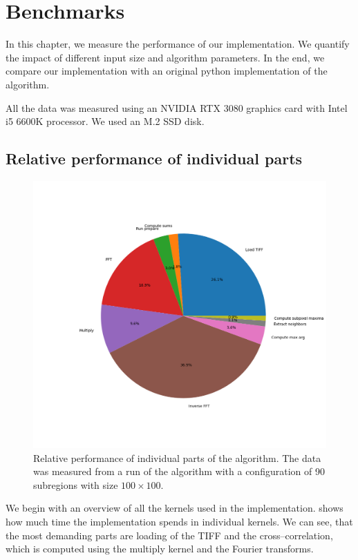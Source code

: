 \chapter{Benchmarks}

In this chapter, we measure the performance of our implementation. We quantify the impact of different input size and algorithm parameters. In the end, we compare our implementation with an original python implementation of the algorithm.

All the data was measured using an NVIDIA RTX 3080 graphics card with Intel i5 6600K processor. We used an M.2 SSD disk.


\section{Relative performance of individual parts}

\begin{figure}
	\centering
	\includegraphics[width=\textwidth]{img/eval/individual-parts}
	\caption{Relative performance of individual parts of the algorithm. The data was measured from a run of the algorithm with a configuration of 90 subregions with size $100 \times 100$.}
	\label{individual-parts}
\end{figure}

We begin with an overview of all the kernels used in the implementation.  shows how much time the implementation spends in individual kernels. We can see, that the most demanding parts are loading of the TIFF and the cross--correlation, which is computed using the multiply kernel and the Fourier transforms. 

